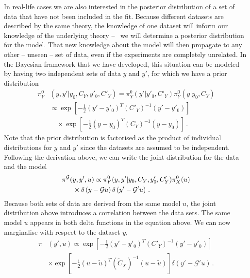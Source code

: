 In real-life cases we are also interested in the posterior distribution of a set
of data that have not been included in the fit. Because different datasets are
described by the same theory, the knowledge of one dataset will inform our
knowledge of the underlying theory -- \ie\ we will determine a posterior
distribution for the model. That new knowledge about the model will then
propagate to any other -- unseen -- set of data, even if the experiments are
completely unrelated. In the Bayesian framework that we have developed, this
situation can be modeled by having two independent sets of data $y$ and $y'$,
for which we have a prior distribution 
\begin{align}
  \label{eq:JointIndepDataPrior}
  \pi_{Y}^0&\left(y,y'|y_0,C_{Y},y'_0,C'_{Y}\right) 
   = \pi_{Y}^0\left(y'|y'_0,C'_{Y}\right) \pi_{Y}^0\left(y|y_0,C_{Y}\right) \nonumber \\
  & \propto 
  \exp\left[-\frac12 \left(y'-y'_0\right)^T (C'_{Y})^{-1} 
  \left(y'-y'_0\right)\right] \nonumber\\
  &\quad\times\exp\left[-\frac12 \left(y-y_0\right)^T (C_{Y})^{-1} 
  \left(y-y_0\right)\right]\, .
\end{align}
Note that the prior distribution is factorised as the product of individual
distributions for $y$ and $y'$ since the datasets are assumed to be independent.
Following the derivation above, we can write the joint distribution for the data
and the model 
\begin{align}
  \label{eq:JointModelData}
  \pi&^{\mathcal{G}}(y,y',u) 
  \propto \pi_{Y}^0(y,y'|y_0,C_{Y},y'_0,C'_{Y}) 
  \pi_{X}^0(u) \nonumber \\
  & \quad \times\delta\left(y - \mathcal{G}u\right)
   \delta\left(y'- \mathcal{G}'u\right)\, .
\end{align}
Because both sets of data are derived from the same model $u$, the joint
distribution above introduces a correlation between the data sets. The same
model $u$ appears in both delta functions in the equation above. We can now
mar\-gi\-na\-li\-se with respect to the dataset $y$, 
\begin{equation}
  \label{eq:MarginaliseDatasetY}
  \begin{split}
    \pi&(y',u) 
    \propto 
    \exp\left[-\frac12 \left(y'-y'_0\right)^T (C'_{Y})^{-1} 
    \left(y'-y'_0\right)\right]\, \nonumber \\
    &\times \exp\left[-\frac12 \left(u-\tilde{u}\right)^T (\tilde{C}_{X})^{-1} 
    \left(u-\tilde{u}\right)\right] 
     \delta\left(y'- \mathcal{G}'u\right)\, .
  \end{split}
\end{equation}

